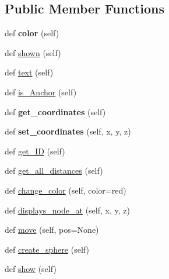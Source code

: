 \subsection*{Public Member Functions}
\begin{DoxyCompactItemize}
\item 
\mbox{\label{class_rendering_1_1_rendered_node_a45e503d244ac0bf916c69c5016664214}} 
def {\bfseries color} (self)
\item 
def \mbox{\hyperlink{class_rendering_1_1_rendered_node_ae531ba5fc89ce010cfdb86441b15eaaa}{shown}} (self)
\item 
def \mbox{\hyperlink{class_rendering_1_1_rendered_node_a73f467422e901c2f8388cedde8228028}{text}} (self)
\item 
def \mbox{\hyperlink{class_rendering_1_1_rendered_node_ad6085aa230d9fd00409dd650b0b549bc}{is\+\_\+\+Anchor}} (self)
\item 
\mbox{\label{class_rendering_1_1_rendered_node_a89c968c83617e2fca6e64e74c6478b58}} 
def {\bfseries get\+\_\+coordinates} (self)
\item 
\mbox{\label{class_rendering_1_1_rendered_node_afc59fd77ac0d0375226e77947f7f6624}} 
def {\bfseries set\+\_\+coordinates} (self, x, y, z)
\item 
def \mbox{\hyperlink{class_rendering_1_1_rendered_node_a09f3f97175c16ea6025da871f653d416}{get\+\_\+\+ID}} (self)
\item 
def \mbox{\hyperlink{class_rendering_1_1_rendered_node_a8497086c897585b6ee2234e8728e69e5}{get\+\_\+all\+\_\+distances}} (self)
\item 
def \mbox{\hyperlink{class_rendering_1_1_rendered_node_a48d6e28dbdac1e5f35453b5dfc4eced3}{change\+\_\+color}} (self, color=\textquotesingle{}red\textquotesingle{})
\item 
def \mbox{\hyperlink{class_rendering_1_1_rendered_node_ae5715012ca52873018e51a9c4db43f7c}{displays\+\_\+node\+\_\+at}} (self, x, y, z)
\item 
def \mbox{\hyperlink{class_rendering_1_1_rendered_node_a6feb931cbee18d2d59c63986d969cc22}{move}} (self, pos=None)
\item 
def \mbox{\hyperlink{class_rendering_1_1_rendered_node_a499bd755942d1f9234b6b5aedcc21801}{create\+\_\+sphere}} (self)
\item 
def \mbox{\hyperlink{class_rendering_1_1_rendered_node_ab4f4398c3f210fe4ea6e720401357691}{show}} (self)

\end{DoxyCompactItemize}
